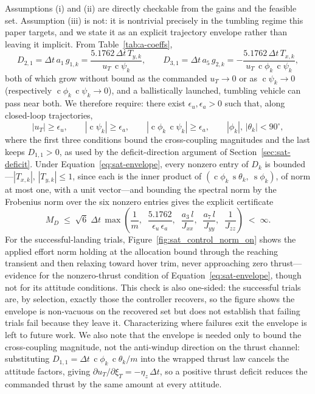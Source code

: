 \documentclass[conf]{new-aiaa}
\DeclareMathOperator{\s}{s}
\DeclareMathOperator{\cs}{c}
\begin{document}
Assumptions (i) and (ii) are directly checkable from the gains and the feasible set. Assumption (iii) is not: it is nontrivial precisely in the tumbling regime this paper targets, and we state it as an explicit trajectory envelope rather than leaving it implicit. From Table~\ref{tab:a-coeffs},
\begin{equation}
D_{2,1} = \Delta t\, a_1\, g_{1,k} = \frac{5.1762\, \Delta t\, T_{y,k}}{u_T\, \cs\psi_k},
\qquad
D_{3,1} = \Delta t\, a_5\, g_{2,k} = -\frac{5.1762\, \Delta t\, T_{x,k}}{u_T\, \cs\phi_k\, \cs\psi_k},
\end{equation}
both of which grow without bound as the commanded $u_T \to 0$ or as $\cs\psi_k \to 0$ (respectively $\cs\phi_k\, \cs\psi_k \to 0$), and a ballistically launched, tumbling vehicle can pass near both. We therefore require: there exist $\epsilon_u, \epsilon_a > 0$ such that, along closed-loop trajectories,
\begin{equation}
\label{eq:sat-envelope}
|u_T| \geq \epsilon_u,
\qquad
|\cs\psi_k| \geq \epsilon_a,
\qquad
|\cs\phi_k\, \cs\psi_k| \geq \epsilon_a,
\qquad
|\phi_k|,\, |\theta_k| < 90^{\circ},
\end{equation}
where the first three conditions bound the cross-coupling magnitudes and the last keeps $D_{1,1} > 0$, as used by the deficit-direction argument of Section~\ref{sec:sat-deficit}. Under Equation~\ref{eq:sat-envelope}, every nonzero entry of $D_k$ is bounded---$|T_{x,k}|,\, |T_{y,k}| \leq 1$, since each is the inner product of $(\cs\phi_k\, \s\theta_k,\ \s\phi_k)$, of norm at most one, with a unit vector---and bounding the spectral norm by the Frobenius norm over the six nonzero entries gives the explicit certificate
\begin{equation}
\label{eq:sat-MD-bound}
M_D \;\leq\; \sqrt{6}\; \Delta t\, \max\!\left( \frac{1}{m},\;\; \frac{5.1762}{\epsilon_u\, \epsilon_a},\;\; \frac{a_3\, l}{J_{xx}},\;\; \frac{a_7\, l}{J_{yy}},\;\; \frac{1}{J_{zz}} \right) \;<\; \infty.
\end{equation}
For the successful-landing trials, Figure~\ref{fig:sat_control_norm_on} shows the applied effort norm holding at the allocation bound through the reaching transient and then relaxing toward hover trim, never approaching zero thrust---evidence for the nonzero-thrust condition of Equation~\ref{eq:sat-envelope}, though not for its attitude conditions. This check is also one-sided: the successful trials are, by selection, exactly those the controller recovers, so the figure shows the envelope is non-vacuous on the recovered set but does not establish that failing trials fail because they leave it. Characterizing where failures exit the envelope is left to future work. We also note that the envelope is needed only to bound the cross-coupling magnitude, not the anti-windup direction on the thrust channel: substituting $D_{1,1} = \Delta t\, \cs\phi_k\, \cs\theta_k / m$ into the wrapped thrust law cancels the attitude factors, giving $\partial u_T / \partial \xi_T = -\eta_z\, \Delta t$, so a positive thrust deficit reduces the commanded thrust by the same amount at every attitude.
\end{document}
